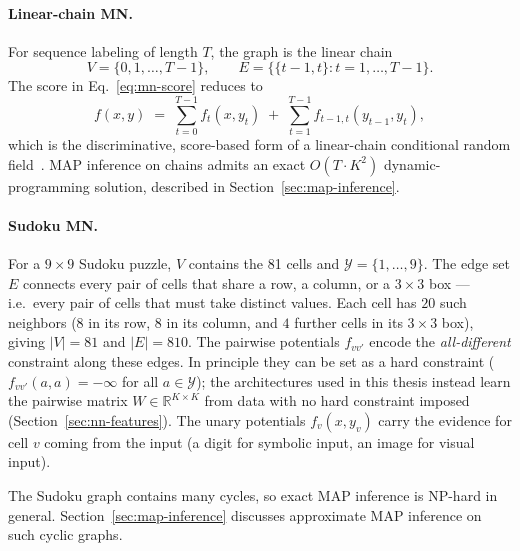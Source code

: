 \paragraph{Linear-chain MN.}
For sequence labeling of length $T$, the graph is the linear chain
\begin{equation}
    V = \{0, 1, \ldots, T - 1\},
    \qquad
    E = \{\{t-1, t\} : t = 1, \ldots, T - 1\}.
\end{equation}
The score in Eq.~\eqref{eq:mn-score} reduces to
\begin{equation}
    f(x, y) \;=\; \sum_{t=0}^{T-1} f_t(x, y_t)
    \;+\; \sum_{t=1}^{T-1} f_{t-1, t}(y_{t-1}, y_t),
    \label{eq:chain-score}
\end{equation}
which is the discriminative, score-based form of a linear-chain
conditional random field~\cite{Lafferty2001}. MAP inference on chains
admits an exact $O(T \cdot K^2)$ dynamic-programming solution,
described in Section~\ref{sec:map-inference}.

\paragraph{Sudoku MN.}
For a $9 \times 9$ Sudoku puzzle, $V$ contains the 81 cells and
$\mathcal{Y} = \{1, \ldots, 9\}$. The edge set $E$ connects every pair
of cells that share a row, a column, or a $3 \times 3$ box ---
i.e.~every pair of cells that must take distinct values. Each cell
has $20$ such neighbors ($8$ in its row, $8$ in its column, and $4$
further cells in its $3 \times 3$ box), giving $|V| = 81$ and
$|E| = 810$. The pairwise potentials $f_{vv'}$ encode the \emph{all-different}
constraint along these edges. In principle they can be set as a hard
constraint ($f_{vv'}(a, a) = -\infty$ for all $a \in \mathcal{Y}$);
the architectures used in this thesis instead learn the pairwise
matrix $W \in \mathbb{R}^{K \times K}$ from data with no hard
constraint imposed (Section~\ref{sec:nn-features}).
The unary potentials $f_v(x, y_v)$ carry the evidence for cell $v$
coming from the input (a digit for symbolic input, an image for
visual input).

The Sudoku graph contains many cycles, so exact MAP inference is
NP-hard in general. Section~\ref{sec:map-inference} discusses
approximate MAP inference on such cyclic graphs.